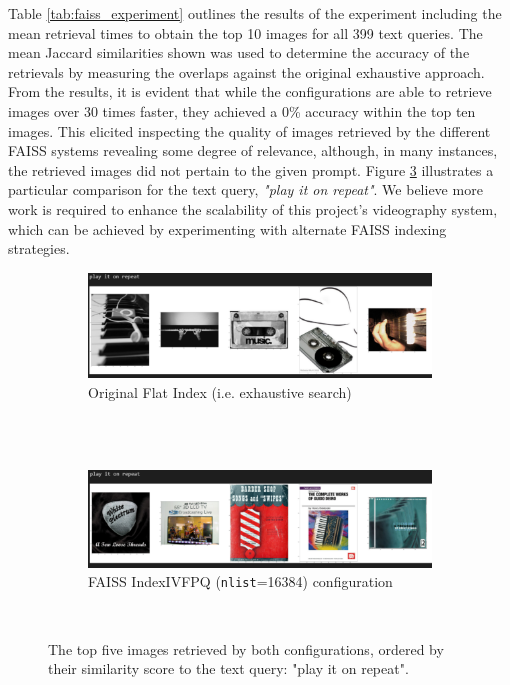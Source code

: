 \documentclass{l4proj}
\begin{document}
Table \ref{tab:faiss_experiment} outlines the results of the experiment including the mean retrieval times to obtain the top 10 images for all 399 text queries. The mean Jaccard similarities shown was used to determine the accuracy of the retrievals by measuring the overlaps against the original exhaustive approach. From the results, it is evident that while the configurations are able to retrieve images over 30 times faster, they achieved a 0\% accuracy within the top ten images. This elicited inspecting the quality of images retrieved by the different FAISS systems revealing some degree of relevance, although, in many instances, the retrieved images did not pertain to the given prompt. Figure \ref{fig:faiss_retrieval_comp} illustrates a particular comparison for the text query, \emph{"play it on repeat"}. We believe more work is required to enhance the scalability of this project's videography system, which can be achieved by experimenting with alternate FAISS indexing strategies.

\begin{figure}[htb]
    \centering
    \begin{subfigure}[b]{1\textwidth}
        \includegraphics[width=\textwidth]{figures/exhaustive_retrievals.pdf}
        \caption{Original Flat Index (i.e. exhaustive search)}
        \label{fig:exhaustive_retrievals}
    \end{subfigure} \\
    ~ 
    \par\medskip
    \begin{subfigure}[b]{1\textwidth}
        \includegraphics[width=\textwidth]{figures/faiss_retrievals.pdf}
        \caption{FAISS IndexIVFPQ (\lstinline|nlist|=16384) configuration}
        \label{fig:faiss_retrievals}
    \end{subfigure}
    ~    
    \caption{The top five images retrieved by both configurations, ordered by their similarity score to the text query: "play it on repeat".}
    \label{fig:faiss_retrieval_comp}
\end{figure}
\end{document}

